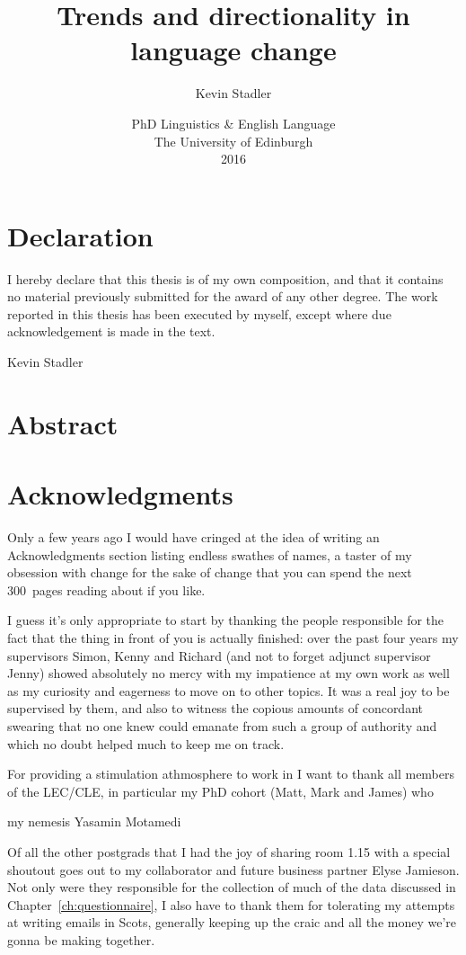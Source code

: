 \documentclass[oneside]{book}
\author{Kevin Stadler}
\title{Trends and directionality in language change}
\date{%
\vfill PhD Linguistics \& English Language\\
The University of Edinburgh\\
2016}
\begin{document}
\frontmatter

\maketitle

\chapter*{Declaration}
I hereby declare that this thesis is of my own composition, and that it contains no material previously submitted for the award of any other degree. The work reported in this thesis has been executed by myself, except where due
acknowledgement is made in the text.

\vspace{1in}\hfill Kevin Stadler

\chapter*{Abstract}


\chapter*{Acknowledgments}

Only a few years ago I would have cringed at the idea of writing an Acknowledgments section listing endless swathes of names, a taster of my obsession with change for the sake of change that you can spend the next 300~pages reading about if you like.

I guess it's only appropriate to start by thanking the people responsible for the fact that the thing in front of you is actually finished: over the past four years my supervisors Simon, Kenny and Richard (and not to forget adjunct supervisor Jenny) showed absolutely no mercy with my impatience at my own work as well as my curiosity and eagerness to move on to other topics. It was a real joy to be supervised by them, and also to witness the copious amounts of concordant swearing that no one knew could emanate from such a group of authority and which no doubt helped much to keep me on track.

For providing a stimulation athmosphere to work in I want to thank all members of the LEC/CLE, in particular my PhD cohort (Matt, Mark and James) who 

my nemesis Yasamin Motamedi

Of all the other postgrads that I had the joy of sharing room 1.15 with a special shoutout goes out to my collaborator and future business partner Elyse Jamieson. Not only were they responsible for the collection of much of the data discussed in Chapter~\ref{ch:questionnaire}, I also have to thank them for tolerating my attempts at writing emails in Scots, generally keeping up the craic and all the money we're gonna be making together.
\end{document}
